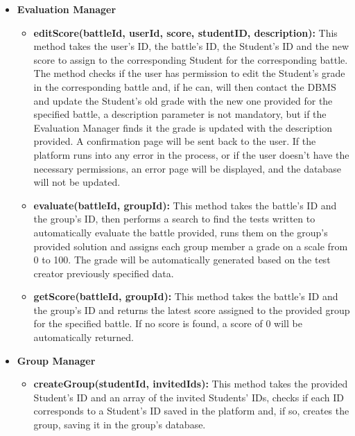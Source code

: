 \documentclass{article}
\begin{document}
{\begin{itemize}
\begin{itemize}
        the evaluated group's ID, then sends each group member a notification via e-mail, letting them know that a new score was assigned to them for their newly
        uploaded solution. This is achieved using external Notification APIs.
        \item \textbf{sendRegistrationNot(userId):} This method is called after a user's registration procedure is completed. Once the user's data is saved 
        in the user's database, an e-mail, containing a confirmation message for the registration procedure is sent to the user.
        This is achieved using external Notification APIs.  
    \end{itemize}
    \item \textbf{Evaluation Manager}
    \begin{itemize}
        \item \textbf{editScore(battleId, userId, score, studentID, description):} This method takes the user's ID, the battle's ID, the Student's ID and the new score to assign to the 
        corresponding Student for the corresponding battle. The method checks if the user has permission to edit the Student's grade in the corresponding battle and, 
        if he can, will then contact the DBMS and update the Student's old grade with the new one provided for the specified battle, a description parameter is not mandatory, 
        but if the Evaluation Manager finds it the grade is updated with the description provided. 
        A confirmation page will be sent back to the user.
        If the platform runs into any error in the process, or if the user doesn't have the necessary permissions, an error page will be displayed, and the database will not be
        updated.
        \item \textbf{evaluate(battleId, groupId):} This method takes the battle's ID and the group's ID, then performs a search to find the tests written to automatically
        evaluate the battle provided, runs them on the group's provided solution and assigns each group member a grade on a scale from 0 to 100.
        The grade will be automatically generated based on the test creator previously specified data.
        \item \textbf{getScore(battleId, groupId):}  This method takes the battle's ID and the group's ID and returns the latest score assigned to the provided group for the 
        specified battle. If no score is found, a score of 0 will be automatically returned.
    \end{itemize}
    \item \textbf{Group Manager}
    \begin{itemize}
        \item \textbf{createGroup(studentId, invitedIds):} This method takes the provided Student's ID and an array of the invited Students' IDs,
        checks if each ID corresponds to a Student's ID saved in the platform and, if so, creates the group, saving it in the group's database.
    \end{itemize}
\end{itemize}

}
\end{document}

